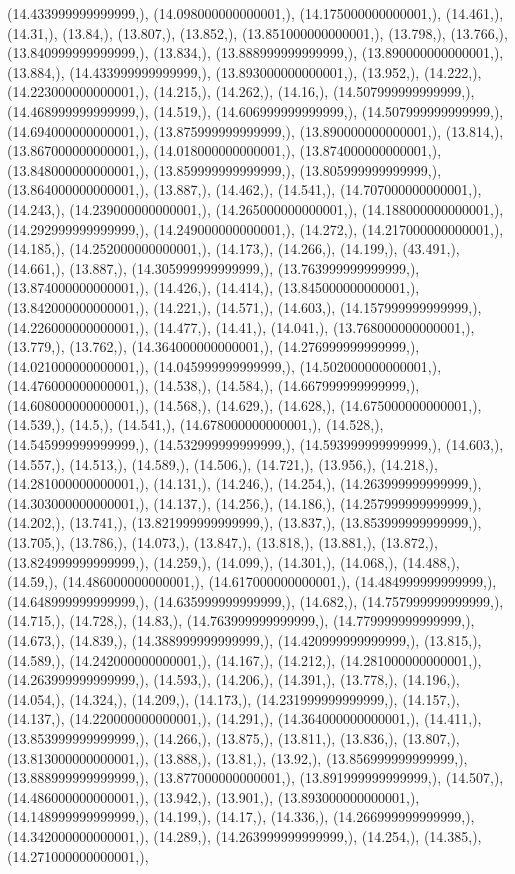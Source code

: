 \documentclass{article}
\begin{document}
(14.433999999999999,), (14.098000000000001,), (14.175000000000001,), (14.461,), (14.31,), (13.84,), (13.807,), (13.852,), (13.851000000000001,), (13.798,), (13.766,), (13.840999999999999,), (13.834,), (13.888999999999999,), (13.890000000000001,), (13.884,), (14.433999999999999,), (13.893000000000001,), (13.952,), (14.222,), (14.223000000000001,), (14.215,), (14.262,), (14.16,), (14.507999999999999,), (14.468999999999999,), (14.519,), (14.606999999999999,), (14.507999999999999,), (14.694000000000001,), (13.875999999999999,), (13.890000000000001,), (13.814,), (13.867000000000001,), (14.018000000000001,), (13.874000000000001,), (13.848000000000001,), (13.859999999999999,), (13.805999999999999,), (13.864000000000001,), (13.887,), (14.462,), (14.541,), (14.707000000000001,), (14.243,), (14.239000000000001,), (14.265000000000001,), (14.188000000000001,), (14.292999999999999,), (14.249000000000001,), (14.272,), (14.217000000000001,), (14.185,), (14.252000000000001,), (14.173,), (14.266,), (14.199,), (43.491,), (14.661,), (13.887,), (14.305999999999999,), (13.763999999999999,), (13.874000000000001,), (14.426,), (14.414,), (13.845000000000001,), (13.842000000000001,), (14.221,), (14.571,), (14.603,), (14.157999999999999,), (14.226000000000001,), (14.477,), (14.41,), (14.041,), (13.768000000000001,), (13.779,), (13.762,), (14.364000000000001,), (14.276999999999999,), (14.021000000000001,), (14.045999999999999,), (14.502000000000001,), (14.476000000000001,), (14.538,), (14.584,), (14.667999999999999,), (14.608000000000001,), (14.568,), (14.629,), (14.628,), (14.675000000000001,), (14.539,), (14.5,), (14.541,), (14.678000000000001,), (14.528,), (14.545999999999999,), (14.532999999999999,), (14.593999999999999,), (14.603,), (14.557,), (14.513,), (14.589,), (14.506,), (14.721,), (13.956,), (14.218,), (14.281000000000001,), (14.131,), (14.246,), (14.254,), (14.263999999999999,), (14.303000000000001,), (14.137,), (14.256,), (14.186,), (14.257999999999999,), (14.202,), (13.741,), (13.821999999999999,), (13.837,), (13.853999999999999,), (13.705,), (13.786,), (14.073,), (13.847,), (13.818,), (13.881,), (13.872,), (13.824999999999999,), (14.259,), (14.099,), (14.301,), (14.068,), (14.488,), (14.59,), (14.486000000000001,), (14.617000000000001,), (14.484999999999999,), (14.648999999999999,), (14.635999999999999,), (14.682,), (14.757999999999999,), (14.715,), (14.728,), (14.83,), (14.763999999999999,), (14.779999999999999,), (14.673,), (14.839,), (14.388999999999999,), (14.420999999999999,), (13.815,), (14.589,), (14.242000000000001,), (14.167,), (14.212,), (14.281000000000001,), (14.263999999999999,), (14.593,), (14.206,), (14.391,), (13.778,), (14.196,), (14.054,), (14.324,), (14.209,), (14.173,), (14.231999999999999,), (14.157,), (14.137,), (14.220000000000001,), (14.291,), (14.364000000000001,), (14.411,), (13.853999999999999,), (14.266,), (13.875,), (13.811,), (13.836,), (13.807,), (13.813000000000001,), (13.888,), (13.81,), (13.92,), (13.856999999999999,), (13.888999999999999,), (13.877000000000001,), (13.891999999999999,), (14.507,), (14.486000000000001,), (13.942,), (13.901,), (13.893000000000001,), (14.148999999999999,), (14.199,), (14.17,), (14.336,), (14.266999999999999,), (14.342000000000001,), (14.289,), (14.263999999999999,), (14.254,), (14.385,), (14.271000000000001,), 
\end{document}
